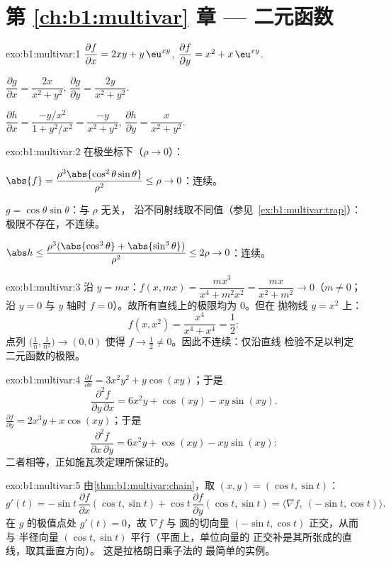 \section*{第 \ref{ch:b1:multivar} 章 --- 二元函数}

\begin{solution}{exo:b1:multivar:1}
$\dfrac{\partial f}{\partial x} = 2xy + y\,\eu^{xy}$,
$\dfrac{\partial f}{\partial y} = x^2 + x\,\eu^{xy}$.

$\dfrac{\partial g}{\partial x} = \dfrac{2x}{x^2+y^2}$,
$\dfrac{\partial g}{\partial y} = \dfrac{2y}{x^2+y^2}$.

$\dfrac{\partial h}{\partial x} = \dfrac{-y/x^2}{1 + y^2/x^2} =
\dfrac{-y}{x^2+y^2}$,
$\dfrac{\partial h}{\partial y} = \dfrac{x}{x^2+y^2}$.
\end{solution}

\begin{solution}{exo:b1:multivar:2}
在极坐标下（$\rho \to 0$）：

$\abs{f} = \dfrac{\rho^3\abs{\cos^2\theta\sin\theta}}{\rho^2} \leq
\rho \to 0$：连续。

$g = \cos\theta\sin\theta$：与 $\rho$ 无关，
沿不同射线取不同值（参见\
\cref{ex:b1:multivar:trap}）：极限不存在，不连续。

$\abs h \leq \dfrac{\rho^3(\abs{\cos^3\theta} +
\abs{\sin^3\theta})}{\rho^2} \leq 2\rho \to 0$：连续。
\end{solution}

\begin{solution}{exo:b1:multivar:3}
沿 $y = mx$：$f(x, mx) = \dfrac{m x^3}{x^4 + m^2 x^2} =
\dfrac{mx}{x^2 + m^2} \to 0$（$m \neq 0$；沿 $y = 0$ 与
$y$ 轴时 $f = 0$）。故所有直线上的极限均为 $0$。但在
抛物线 $y = x^2$ 上：
\[
f(x, x^2) = \frac{x^4}{x^4 + x^4} = \frac12 :
\]
点列 $\bigl(\frac1n, \frac{1}{n^2}\bigr) \to (0,0)$ 使得
$f \to \frac12 \neq 0$。因此不连续：仅沿直线
检验不足以判定二元函数的极限。
\end{solution}

\begin{solution}{exo:b1:multivar:4}
$\frac{\partial f}{\partial x} = 3x^2y^2 + y\cos(xy)$；于是
\[
\frac{\partial^2 f}{\partial y\,\partial x}
= 6x^2 y + \cos(xy) - xy\sin(xy) .
\]
$\frac{\partial f}{\partial y} = 2x^3 y + x\cos(xy)$；于是
\[
\frac{\partial^2 f}{\partial x\,\partial y}
= 6x^2 y + \cos(xy) - xy\sin(xy) :
\]
二者相等，正如施瓦茨定理所保证的。
\end{solution}

\begin{solution}{exo:b1:multivar:5}
由\cref{thm:b1:multivar:chain}，取 $(x, y) = (\cos t, \sin t)$：
\[
g'(t) = -\sin t\,\frac{\partial f}{\partial x}(\cos t, \sin t)
+ \cos t\,\frac{\partial f}{\partial y}(\cos t, \sin t)
= \bigl\langle \nabla f,\ (-\sin t, \cos t)\bigr\rangle .
\]
在 $g$ 的极值点处 $g'(t) = 0$，故 $\nabla f$ 与
圆的切向量 $(-\sin t, \cos t)$ 正交，从而与
半径向量 $(\cos t, \sin t)$ 平行（平面上，单位向量的
正交补是其所张成的直线，取其垂直方向）。
这是拉格朗日乘子法的
最简单的实例。
\end{solution}

